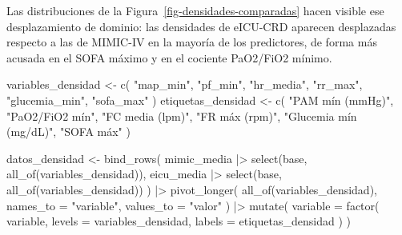 \documentclass[
  spanish,
  a4paper,
  12pt,
  twoside]{memoir}
\newenvironment{Shaded}{\begin{snugshade}}{\end{snugshade}}
\newcommand{\AttributeTok}[1]{\textcolor[rgb]{0.40,0.45,0.13}{#1}}
\newcommand{\FunctionTok}[1]{\textcolor[rgb]{0.28,0.35,0.67}{#1}}
\newcommand{\NormalTok}[1]{\textcolor[rgb]{0.00,0.23,0.31}{#1}}
\newcommand{\OtherTok}[1]{\textcolor[rgb]{0.00,0.23,0.31}{#1}}
\newcommand{\SpecialCharTok}[1]{\textcolor[rgb]{0.37,0.37,0.37}{#1}}
\newcommand{\StringTok}[1]{\textcolor[rgb]{0.13,0.47,0.30}{#1}}
\begin{document}
Las distribuciones de la Figura~\ref{fig-densidades-comparadas} hacen
visible ese desplazamiento de dominio: las densidades de eICU-CRD
aparecen desplazadas respecto a las de MIMIC-IV en la mayoría de los
predictores, de forma más acusada en el SOFA máximo y en el cociente
PaO2/FiO2 mínimo.

\begin{Shaded}
\begin{Highlighting}[]
\NormalTok{variables\_densidad }\OtherTok{\textless{}{-}} \FunctionTok{c}\NormalTok{(}
  \StringTok{"map\_min"}\NormalTok{, }\StringTok{"pf\_min"}\NormalTok{, }\StringTok{"hr\_media"}\NormalTok{,}
  \StringTok{"rr\_max"}\NormalTok{, }\StringTok{"glucemia\_min"}\NormalTok{, }\StringTok{"sofa\_max"}
\NormalTok{)}
\NormalTok{etiquetas\_densidad }\OtherTok{\textless{}{-}} \FunctionTok{c}\NormalTok{(}
  \StringTok{"PAM mín (mmHg)"}\NormalTok{, }\StringTok{"PaO2/FiO2 mín"}\NormalTok{, }\StringTok{"FC media (lpm)"}\NormalTok{,}
  \StringTok{"FR máx (rpm)"}\NormalTok{, }\StringTok{"Glucemia mín (mg/dL)"}\NormalTok{, }\StringTok{"SOFA máx"}
\NormalTok{)}

\NormalTok{datos\_densidad }\OtherTok{\textless{}{-}} \FunctionTok{bind\_rows}\NormalTok{(}
\NormalTok{  mimic\_media }\SpecialCharTok{|\textgreater{}} \FunctionTok{select}\NormalTok{(base, }\FunctionTok{all\_of}\NormalTok{(variables\_densidad)),}
\NormalTok{  eicu\_media  }\SpecialCharTok{|\textgreater{}} \FunctionTok{select}\NormalTok{(base, }\FunctionTok{all\_of}\NormalTok{(variables\_densidad))}
\NormalTok{) }\SpecialCharTok{|\textgreater{}}
  \FunctionTok{pivot\_longer}\NormalTok{(}
    \FunctionTok{all\_of}\NormalTok{(variables\_densidad),}
    \AttributeTok{names\_to =} \StringTok{"variable"}\NormalTok{, }\AttributeTok{values\_to =} \StringTok{"valor"}
\NormalTok{  ) }\SpecialCharTok{|\textgreater{}}
  \FunctionTok{mutate}\NormalTok{(}
    \AttributeTok{variable =} \FunctionTok{factor}\NormalTok{(}
\NormalTok{      variable, }\AttributeTok{levels =}\NormalTok{ variables\_densidad,}
      \AttributeTok{labels =}\NormalTok{ etiquetas\_densidad}
\NormalTok{    )}
\NormalTok{  )}


\end{Highlighting}
\end{Shaded}
\end{document}
